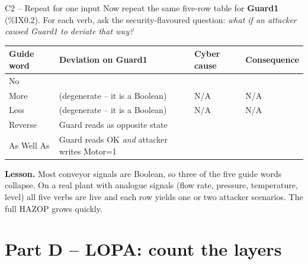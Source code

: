 \documentclass[11pt,a4paper]{article}
\begin{document}
\begin{stepbox}{C2 -- Repeat for one input}
Now repeat the same five-row table for \textbf{Guard1} (\%IX0.2). For each verb, ask the security-flavoured question: \emph{what if an attacker caused Guard1 to deviate that way?}

\medskip
\renewcommand{\arraystretch}{1.35}
\footnotesize
\begin{tabular}{|p{16mm}|p{32mm}|p{46mm}|p{46mm}|}
\hline
\textbf{Guide word} & \textbf{Deviation on Guard1} & \textbf{Cyber cause} & \textbf{Consequence} \\
\hline
No          & & & \\
\hline
More        & (degenerate -- it is a Boolean) & N/A & N/A \\
\hline
Less        & (degenerate -- it is a Boolean) & N/A & N/A \\
\hline
Reverse     & Guard reads as opposite state & & \\
\hline
As Well As  & Guard reads OK \emph{and} attacker writes Motor=1 & & \\
\hline
\end{tabular}

\medskip\noindent
\textbf{Lesson.} Most conveyor signals are Boolean, so three of the five guide words collapse. On a real plant with analogue signals (flow rate, pressure, temperature, level) all five verbs are live and each row yields one or two attacker scenarios. The full HAZOP grows quickly.
\end{stepbox}

\section*{Part D -- LOPA: count the layers}
\end{document}
